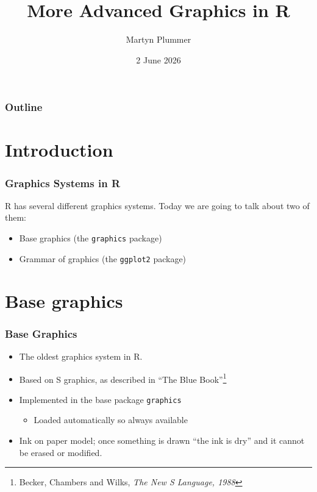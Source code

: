 \documentclass[xcolor=svgnames]{beamer}
\title{More Advanced Graphics in R}
\author[Martyn Plummer]
{Martyn Plummer}
\institute[Warwick] %
{
    University of Warwick, UK
}
\date[SPE 2026] %
{2 June 2026}
\newcommand{\code}[1]{\texttt{#1}}
\begin{document}
\begin{frame}[plain]
  \titlepage
\end{frame}

\begin{frame}
  \frametitle{Outline}
  \tableofcontents
\end{frame}

\section{Introduction}

\begin{frame}
  \frametitle{Graphics Systems in R}  

  R has several different graphics systems. Today we are going to talk about two of them:
  \begin{itemize}
  \item Base graphics (the \code{graphics} package)
  \item Grammar of graphics (the \code{ggplot2} package)
  \end{itemize}
  
\end{frame}

\section{Base graphics}

\begin{frame}
  \frametitle{Base Graphics}
  \begin{itemize}
  \item The oldest graphics system in R.
  \item Based on S graphics, as described in ``The Blue Book''\footnote{Becker, Chambers and Wilks, 
    {\em The New S Language, 1988}}
  \item Implemented in the base package \code{graphics} 
    \begin{itemize}
    \item Loaded automatically so always available
    \end{itemize}
  \item Ink on paper model; once something is drawn ``the ink is dry'' and it 
         cannot be erased or modified.
  \end{itemize}
\end{frame}
\end{document}
